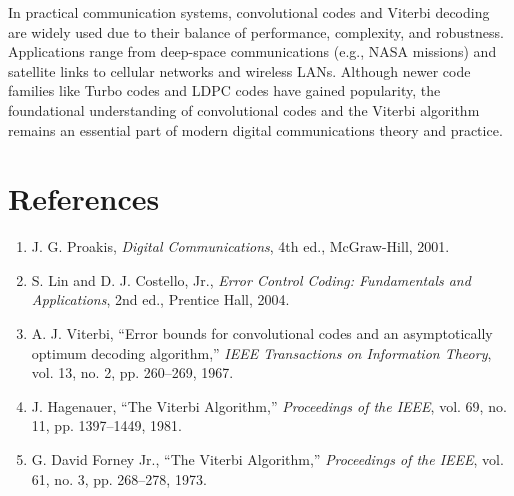 \documentclass[12pt,a4paper]{article}
\begin{document}
In practical communication systems, convolutional codes and Viterbi decoding are widely used due to their balance of performance, complexity, and robustness. Applications range from deep-space communications (e.g., NASA missions) and satellite links to cellular networks and wireless LANs. Although newer code families like Turbo codes and LDPC codes have gained popularity, the foundational understanding of convolutional codes and the Viterbi algorithm remains an essential part of modern digital communications theory and practice.

\section*{References}

\begin{enumerate}
    \item J. G. Proakis, \emph{Digital Communications}, 4th ed., McGraw-Hill, 2001.
    \item S. Lin and D. J. Costello, Jr., \emph{Error Control Coding: Fundamentals and Applications}, 2nd ed., Prentice Hall, 2004.
    \item A. J. Viterbi, ``Error bounds for convolutional codes and an asymptotically optimum decoding algorithm,'' \emph{IEEE Transactions on Information Theory}, vol. 13, no. 2, pp. 260--269, 1967.
    \item J. Hagenauer, ``The Viterbi Algorithm,'' \emph{Proceedings of the IEEE}, vol. 69, no. 11, pp. 1397--1449, 1981.
    \item G. David Forney Jr., ``The Viterbi Algorithm,'' \emph{Proceedings of the IEEE}, vol. 61, no. 3, pp. 268--278, 1973.
\end{enumerate}
\end{document}
